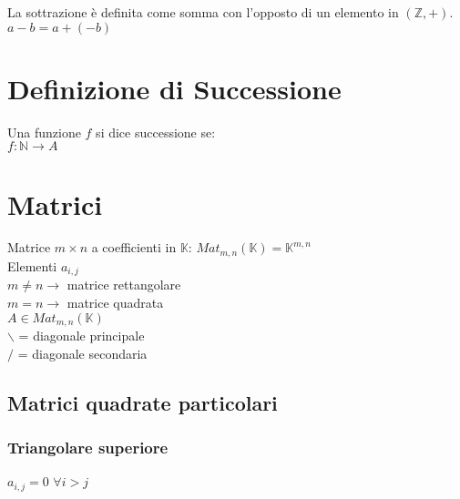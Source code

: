\documentclass[a4paper, twoside, italian, 11pt]{book}
\newcommand{\N}{\mathbb{N}}
\newcommand{\Z}{\mathbb{Z}}
\newcommand{\K}{\mathbb{K}}
\begin{document}
La sottrazione è definita come somma con l'opposto di un elemento in $(\Z, +)$. \\

$a - b = a + (-b)$



\section{Definizione di Successione}

Una funzione $f$ si dice successione se: \\

$f : \N \rightarrow A$






\section {Matrici}

Matrice $m \times n$ a coefficienti in $\K$: $Mat_{m,n}(\K) = \K^{m,n}$ \\

\noindent
Elementi $a_{i, j}$ \\

\noindent
$m \neq n \rightarrow$ matrice rettangolare \\
$m = n \rightarrow$ matrice quadrata \\

\noindent
$A \in Mat_{m,n}(\K)$ \\

\noindent
$\backslash$ = diagonale principale \\
$/$ = diagonale secondaria \\


\subsection{Matrici quadrate particolari}


\subsubsection{Triangolare superiore}

$a_{i,j} = 0$ $\forall i > j$ \\
\end{document}

